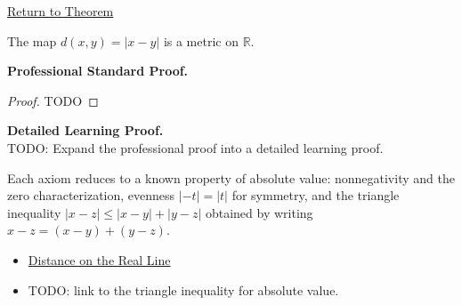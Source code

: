\newpage
{}
\label{prf:distance-is-a-metric}

\begin{remark*}[Return]
\hyperref[thm:distance-is-a-metric]{Return to Theorem}
\end{remark*}

\begin{theorem*}
The map $d(x,y)=|x-y|$ is a metric on $\mathbb{R}$.
\end{theorem*}

\textbf{Professional Standard Proof.}~\\
\begin{proof}
TODO
\end{proof}

\textbf{Detailed Learning Proof.}~\\
TODO: Expand the professional proof into a detailed learning proof.

\begin{remark*}
Each axiom reduces to a known property of absolute value: nonnegativity and the zero characterization, evenness $|{-t}|=|t|$ for symmetry, and the triangle inequality $|x-z|\le|x-y|+|y-z|$ obtained by writing $x-z=(x-y)+(y-z)$.
\end{remark*}

\begin{dependencies}
\begin{itemize}
  \item \hyperref[def:distance-on-real-line]{Distance on the Real Line}
  \item TODO: link to the triangle inequality for absolute value.
\end{itemize}
\end{dependencies}
